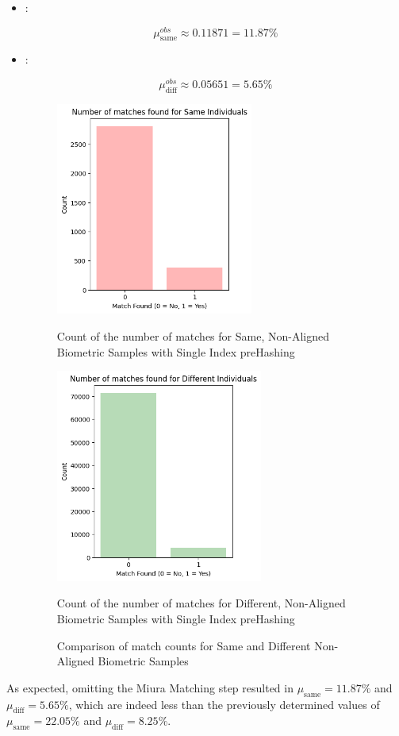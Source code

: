 \begin{itemize}
    \item {}: 
    
    \[ \mu_{\text{same}}^{obs} \approx 0.11871 = 11.87\%\]
    
    \item {}:
    
    \[ \mu_{\text{diff}}^{obs} \approx 0.05651 = 5.65\% \]

    \begin{figure}[H]
        \centering
        \begin{minipage}[b]{0.48\linewidth}
            \centering
            \includegraphics[width=\linewidth,height=7cm,keepaspectratio]{latex-img/mu_same_without_postAlignment.png}
            \caption{Count of the number of matches for Same, Non-Aligned Biometric Samples with Single Index preHashing}
            \label{mu_same_without_postAlignement}
        \end{minipage}
        \hfill
        \begin{minipage}[b]{0.48\linewidth}
            \centering
            \includegraphics[width=\linewidth,height=7cm,keepaspectratio]{latex-img/mu_diff_without_postAlignment.png}
            \caption{Count of the number of matches for Different, Non-Aligned Biometric Samples with Single Index preHashing}
            \label{mu_diff_without_postAlignement}
        \end{minipage}
        \caption{Comparison of match counts for Same and Different Non-Aligned Biometric Samples}
    \end{figure}
\end{itemize}

As expected, omitting the Miura Matching step resulted in \(\mu_{\text{same}} = 11.87\%\) and \(\mu_{\text{diff}} = 5.65\%\), which are indeed less than the previously determined values of \(\mu_{\text{same}} = 22.05\%\) and \(\mu_{\text{diff}} = 8.25\%\).

